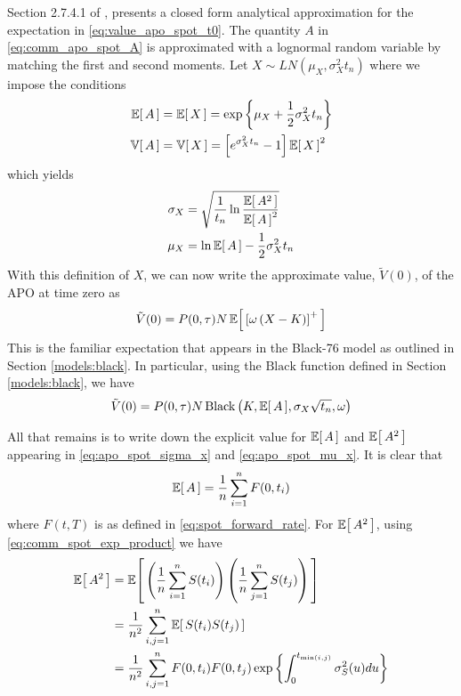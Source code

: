 Section 2.7.4.1 of \cite{Clark_2014}, presents a closed form analytical approximation for the expectation in \eqref{eq:value_apo_spot_t0}. The quantity $A$ in \eqref{eq:comm_apo_spot_A} is approximated with a lognormal random variable by matching the first and second moments. Let $X \sim LN(\mu_X, \sigma^2_X t_n)$ where we impose the conditions
\begingroup
\addtolength{\jot}{0.5em}
\begin{align}
\Ex{A} &= \Ex{X} = \exp \left\{ \mu_X + \frac{1}{2} \sigma^2_X t_n \right\} \\
\Var{A} &= \Var{X} = \left[ e^{\sigma^2_X t_n} - 1 \right] \Ex{X}^2
\end{align}
\endgroup
which yields
\begingroup
\addtolength{\jot}{0.5em}
\begin{align}
\sigma_X &= \sqrt{ \frac{1}{t_n} \ln \frac{\Ex{A^2}}{\Ex{A}^2} } \label{eq:apo_spot_sigma_x} \\
\mu_X &= \ln \Ex{A} - \frac{1}{2} \sigma^2_X t_n \label{eq:apo_spot_mu_x}
\end{align}
\endgroup
With this definition of $X$, we can now write the approximate value, $\tilde{V}(0)$, of the APO at time zero as
\begin{equation}
\tilde{V}(0) = P(0, \tau) N \Ex{ \left[ \omega \left( X - K \right) \right]^{+} }
\end{equation}
This is the familiar expectation that appears in the Black-76 model as outlined in Section \ref{models:black}. In particular, using the $\text{Black}$ function defined in Section \ref{models:black}, we have
\begin{equation}
\tilde{V}(0) = P(0, \tau) N \, \text{Black} \left( K, \Ex{A}, \sigma_X \sqrt{t_n}, \omega \right)
\end{equation}

All that remains is to write down the explicit value for $\Ex{A}$ and $\Ex{A^2}$ appearing in \eqref{eq:apo_spot_sigma_x} and \eqref{eq:apo_spot_mu_x}. It is clear that
\begin{equation}
\Ex{A} = \frac{1}{n} \sum_{i=1}^{n} F(0, t_i)
\end{equation}
where $F(t, T)$ is as defined in \eqref{eq:spot_forward_rate}. For $\Ex{A^2}$, using \eqref{eq:comm_spot_exp_product} we have
\begin{equation}
\begin{split}
\Ex{A^2} &= \Ex{ \left( \frac{1}{n} \sum_{i=1}^{n} S(t_{i}) \right) \left( \frac{1}{n} \sum_{j=1}^{n} S(t_{j}) \right) } \\
         &= \frac{1}{n^2} \sum_{i,j=1}^{n} \Ex{ S(t_{i}) S(t_{j}) } \\
         &= \frac{1}{n^2} \sum_{i,j=1}^{n} F(0, t_i) F(0, t_j) \exp \left\{ \int_{0}^{t_{\min(i,j)}} \sigma^2_S(u) du \right\}
\end{split}
\end{equation}

